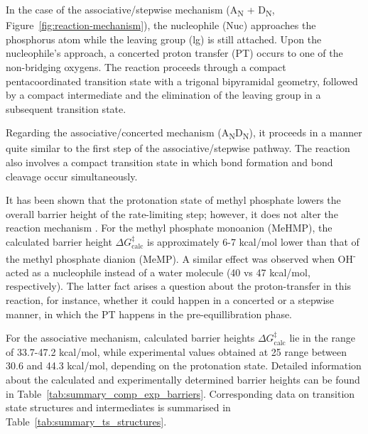 In the case of the associative/stepwise mechanism (A\textsubscript{N} + D\textsubscript{N}, Figure~\ref{fig:reaction-mechanism}), the nucleophile (Nuc) approaches the phosphorus atom while the leaving group (lg) is still attached. Upon the nucleophile's approach, a concerted proton transfer (PT) occurs to one of the non-bridging oxygens. The reaction proceeds through a compact pentacoordinated transition state with a trigonal bipyramidal geometry, followed by a compact intermediate and the elimination of the leaving group in a subsequent transition state.

Regarding the associative/concerted mechanism (A\textsubscript{N}D\textsubscript{N}), it proceeds in a manner quite similar to the first step of the associative/stepwise pathway. The reaction also involves a compact transition state in which bond formation and bond cleavage occur simultaneously.

It has been shown that the protonation state of methyl phosphate lowers the overall barrier height of the rate-limiting step; however, it does not alter the reaction mechanism \citep{hassanEffectProtonationMechanism2017}. For the methyl phosphate monoanion (MeHMP), the calculated barrier height $\Delta G^{\ddagger}_{\text{calc}}$ is approximately 6-7 kcal/mol lower than that of the methyl phosphate dianion (MeMP). A similar effect was observed when OH\textsuperscript{-} acted as a nucleophile instead of a water molecule \citep{klahnMechanismHydrolysisPhosphate2006} (40 vs 47 kcal/mol, respectively). The latter fact arises a question about the proton-transfer in this reaction, for instance, whether it could happen in a concerted or a stepwise manner, in which the PT happens in the pre-equillibration phase.

For the associative mechanism, calculated barrier heights $\Delta G^{\ddagger}_{\text{calc}}$ lie in the range of 33.7-47.2 kcal/mol, while experimental values obtained at 25  range between 30.6 and 44.3 kcal/mol, depending on the protonation state. Detailed information about the calculated and experimentally determined barrier heights can be found in Table~\ref{tab:summary_comp_exp_barriers}. Corresponding data on transition state structures and intermediates is summarised in Table~\ref{tab:summary_ts_structures}.


